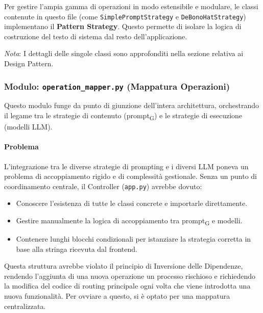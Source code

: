 \documentclass[11pt,a4paper]{article}
\newcommand{\gls}[1]{#1\textsubscript{G}}
\begin{document}
Per gestire l'ampia gamma di operazioni in modo estensibile e modulare, le classi contenute in questo file (come \texttt{SimplePromptStrategy} e \texttt{DeBonoHatStrategy}) implementano il \textbf{Pattern Strategy}. Questo permette di isolare la logica di costruzione del testo di sistema dal resto dell'applicazione.

\textit{Nota}: I dettagli delle singole classi sono approfonditi nella sezione relativa ai Design Pattern.


\subsubsection{Modulo: \texttt{operation\_mapper.py} (Mappatura Operazioni)}
Questo modulo funge da punto di giunzione dell'intera architettura, orchestrando il legame tra le strategie di contenuto (\gls{prompt}) e le strategie di esecuzione (modelli LLM).

\paragraph{Problema}
L’integrazione tra le diverse strategie di prompting e i diversi LLM poneva un problema di accoppiamento rigido e di complessità gestionale. Senza un punto di coordinamento centrale, il Controller (\texttt{app.py}) avrebbe dovuto:
\begin{itemize}
    \item Conoscere l'esistenza di tutte le classi concrete e importarle direttamente.
    \item Gestire manualmente la logica di accoppiamento tra \gls{prompt} e modelli.
    \item Contenere lunghi blocchi condizionali per istanziare la strategia corretta in base alla stringa ricevuta dal frontend.
\end{itemize}
Questa struttura avrebbe violato il principio di Inversione delle Dipendenze, rendendo l'aggiunta di una nuova operazione un processo rischioso e richiedendo la modifica del codice di routing principale ogni volta che viene introdotta una nuova funzionalità. Per ovviare a questo, si è optato per una mappatura centralizzata.
\end{document}
